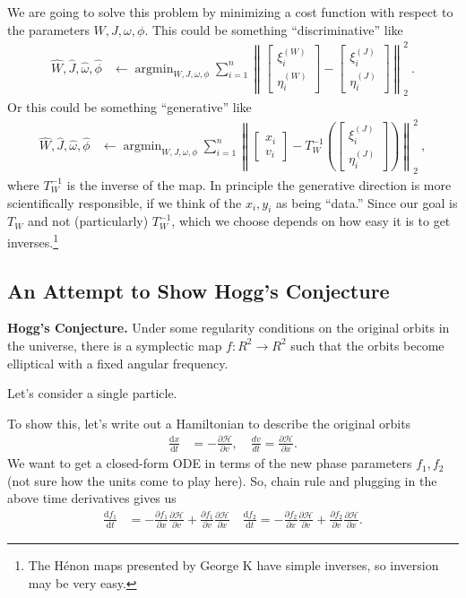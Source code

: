 \documentclass{article}
\newcommand{\dd}{\mathrm{d}}
\DeclareMathOperator*{\argmin}{argmin}
\newcommand{\norm}[1]{\left\lVert#1\right\rVert_2^2}
\begin{document}
We are going to solve this problem by minimizing a cost function with respect to the parameters $W,J,\omega,\phi$.
This could be something ``discriminative'' like
\begin{align}
    \hat{W},\hat{J},\hat{\omega},\hat{\phi} &\leftarrow \argmin_{W,J,\omega,\phi} \sum_{i=1}^n\norm{\begin{bmatrix}\xi^{(W)}_i \\ \eta^{(W)}_i\end{bmatrix} - \begin{bmatrix}\xi^{(J)}_i \\ \eta^{(J)}_i\end{bmatrix}} ~.
\end{align}
Or this could be something ``generative'' like
\begin{align}
    \hat{W},\hat{J},\hat{\omega},\hat{\phi} &\leftarrow \argmin_{W,J,\omega,\phi} \sum_{i=1}^n\norm{\begin{bmatrix}x_i \\ v_i\end{bmatrix} - T_W^{-1}(\begin{bmatrix}\xi^{(J)}_i \\ \eta^{(J)}_i\end{bmatrix})} ~,
\end{align}
where $T_W^{-1}$ is the inverse of the map.
In principle the generative direction is more scientifically responsible, if we think of the $x_i, y_i$ as being ``data.''
Since our goal is $T_W$ and not (particularly) $T_W^{-1}$, which we choose depends on how easy it is to get inverses.\footnote{The H\'enon maps presented by George K have simple inverses, so inversion may be very easy.}

\subsection{An Attempt to Show Hogg's Conjecture}

\textbf{Hogg's Conjecture.} Under some regularity conditions on the original orbits in the universe, there is a symplectic map $f : R^2 \to R^2$ such that the orbits become elliptical with a fixed angular frequency. 

Let's consider a single particle. 

To show this, let's write out a Hamiltonian to describe the original orbits
\begin{align}
    \frac{\dd x}{\dd t} &= - \frac{\partial \mathcal{H}}{\partial v}, \quad \frac{d v}{dt} = \frac{\partial \mathcal{H}}{\partial x}. 
\end{align}
We want to get a closed-form ODE in terms of the new phase parameters $f_1, f_2$ (not sure how the units come to play here). So, chain rule and plugging in the above time derivatives gives us 
\begin{align}
    \frac{\dd f_1}{\dd t} &= - \frac{\partial f_1}{\partial x} \frac{\partial \mathcal{H}}{\partial v} + \frac{\partial f_1}{\partial v} \frac{\partial \mathcal{H}}{\partial x} \quad
    \frac{\dd f_2}{\dd t} = - \frac{\partial f_2}{\partial x} \frac{\partial \mathcal{H}}{\partial v} + \frac{\partial f_2}{\partial v} \frac{\partial \mathcal{H}}{\partial x}.
\end{align}
\end{document}
